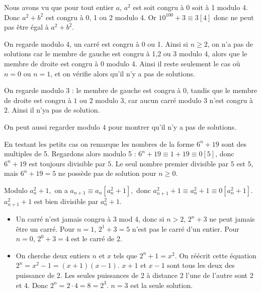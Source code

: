 \begin{sol}
Nous avons vu que pour tout entier $a$, $a^2$ est soit congru à 0 soit à 1 modulo 4. Donc $a^2 + b^2$ est congru à 0, 1 ou 2 modulo 4. Or $10^{100} + 3\equiv 3[4]$ donc ne peut pas être égal à $a^2 + b^2$.
\end{sol}


\begin{sol}
On regarde modulo 4, un carré est congru à 0 ou 1. Ainsi si $n\ge 2$, on n'a pas de solutions car le membre de gauche est congru à 1,2 ou 3 modulo 4, alors que le membre de droite est congru à 0 modulo 4. Ainsi il reste seulement le cas où $n=0$ ou $n=1$, et on vérifie alors qu'il n'y a pas de solutions.
\end{sol}


\begin{sol}
On regarde modulo 3 : le membre de gauche est congru à $0$, tandis que le membre de droite est congru à $1$ ou $2$ modulo $3$, car aucun carré modulo $3$ n'est congru à $2$. Ainsi il n'ya pas de solution.

\smallskip

On peut aussi regarder modulo $4$ pour montrer qu'il n'y a pas de solutions.
\end{sol}


\begin{sol}
En testant les petits cas on remarque les nombres de la forme $6^n+19$ sont des multiples de 5. Regardons alors modulo 5 :
\newline
$6^n+19\equiv 1+19\equiv 0[5]$, donc $6^n+19$ est toujours divisible par $5$. Le seul nombre premier divisible par $5$ est $5$, mais $6^n+19=5$ ne possède pas de solution pour $n\ge 0$.
\end{sol}


\begin{sol}
Modulo $a_n^2+1,$ on a $a_{n+1}\equiv a_n[a_n^2+1],$ donc $a_{n+1}^2+1\equiv a_n^2+1\equiv 0[a_n^2+1]$. $a_{n+1}^2+1$ est bien divisible par $a_n^2+1$.
\end{sol}


\begin{sol}
\begin{itemize}
\item Un carré n’est jamais congru à 3 mod 4, donc si $n > 2$, $2^n + 3$ ne peut jamais être un carré. Pour $n = 1$, $2^1 + 3 = 5$ n’est pas le carré d’un entier. Pour $n = 0$, $2^0 + 3 = 4$ est le carré de 2.
\item On cherche deux entiers $n$ et $x$ tels que $2^n + 1 = x^2$. On réécrit cette équation $2^n =x^2-1 = (x + 1)(x - 1)$. $x + 1$ et $x - 1$ sont tous les deux des puissance de 2. Les seules puissances de 2 à distance 2 l’une de l’autre sont 2 et 4. Donc $2^n = 2 \cdot 4 = 8 = 2^3$. $n = 3$ est la seule solution.
\end{itemize}
\end{sol}


